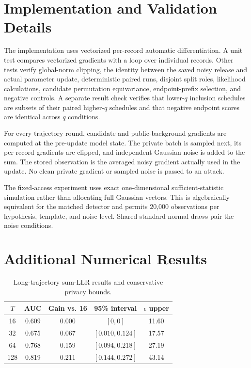 \documentclass[conference]{IEEEtran}
\begin{document}



\appendices

\section{Implementation and Validation Details}

The implementation uses vectorized per-record automatic differentiation. A unit test compares vectorized gradients with a loop over individual records. Other tests verify global-norm clipping, the identity between the saved noisy release and actual parameter update, deterministic paired runs, disjoint split roles, likelihood calculations, candidate permutation equivariance, endpoint-prefix selection, and negative controls. A separate result check verifies that lower-$q$ inclusion schedules are subsets of their paired higher-$q$ schedules and that negative endpoint scores are identical across $q$ conditions.

For every trajectory round, candidate and public-background gradients are computed at the pre-update model state. The private batch is sampled next, its per-record gradients are clipped, and independent Gaussian noise is added to the sum. The stored observation is the averaged noisy gradient actually used in the update. No clean private gradient or sampled noise is passed to an attack.

The fixed-access experiment uses exact one-dimensional sufficient-statistic simulation rather than allocating full Gaussian vectors. This is algebraically equivalent for the matched detector and permits 20,000 observations per hypothesis, template, and noise level. Shared standard-normal draws pair the noise conditions.

\section{Additional Numerical Results}

\begin{table}[h]
\caption{Long-trajectory sum-LLR results and conservative privacy bounds.}
\centering
\begin{tabular}{ccccc}
\toprule
$T$ & AUC & Gain vs. 16 & 95\% interval & $\epsilon$ upper \\
\midrule
16 & 0.609 & 0.000 & $[0,0]$ & 11.60 \\
32 & 0.675 & 0.067 & $[0.010,0.124]$ & 17.57 \\
64 & 0.768 & 0.159 & $[0.094,0.218]$ & 27.19 \\
128 & 0.819 & 0.211 & $[0.144,0.272]$ & 43.14 \\
\bottomrule
\end{tabular}
\end{table}
\end{document}
